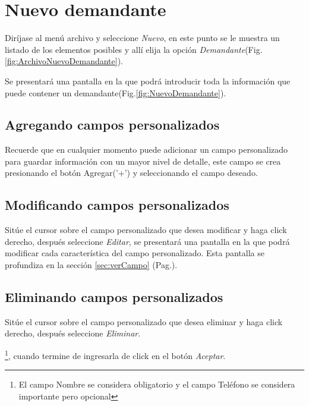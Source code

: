 \section{Nuevo demandante}
\label{sec:nuevoDemandante}
Dir\'ijase al men\'u archivo y seleccione \emph{Nuevo}, en este punto se le muestra un listado de los elementos posibles y
all\'i elija la opci\'on \emph{Demandante}(Fig.\ref{fig:ArchivoNuevoDemandante}). 
  

Se presentar\'a una pantalla en la que podr\'a introducir toda la informaci\'on
que puede contener un demandante(Fig.\ref{fig:NuevoDemandante}). 
  

\subsection{Agregando campos personalizados}
\label{sec:agregarCamposDemandante}
Recuerde que en cualquier momento puede adicionar un campo personalizado para guardar informaci\'on con un mayor nivel de detalle, este campo se crea presionando el bot\'on Agregar('+') y seleccionando el campo deseado.

\subsection{Modificando campos personalizados}
\label{sec:modificarCamposDemandante}
Sit\'ue el cursor sobre el campo personalizado que desea modificar y haga click derecho, despu\'es seleccione \emph{Editar},
se presentar\'a una pantalla en la que podr\'a modificar cada caracter\'istica
del campo personalizado. Esta pantalla se profundiza en la secci\'on
\ref{sec:verCampo} (Pag.\pageref{sec:verCampo}).

\subsection{Eliminando campos personalizados}
\label{sec:eliminarCamposDemandante}
Sit\'ue el cursor sobre el campo personalizado que desea eliminar y haga click derecho, despu\'es seleccione \emph{Eliminar}.

\footnote{El campo Nombre se considera obligatorio y el campo Tel\'efono se
considera importante pero opcional},
cuando termine de ingresarla de click en el bot\'on \emph{Aceptar}.



